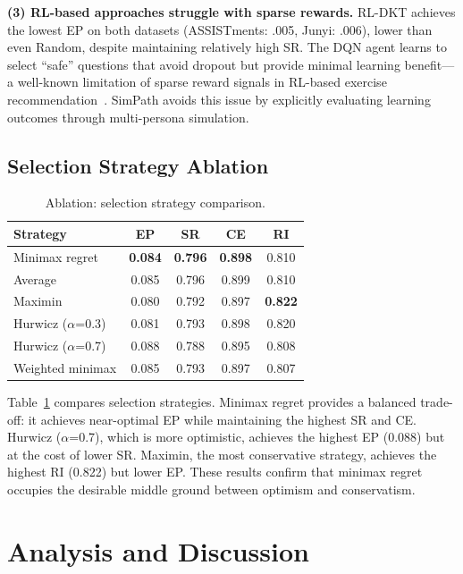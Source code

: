 \documentclass[runningheads]{llncs}
\begin{document}
\textbf{(3) RL-based approaches struggle with sparse rewards.}
RL-DKT achieves the lowest EP on both datasets (ASSISTments: .005, Junyi: .006), lower than even Random, despite maintaining relatively high SR.
The DQN agent learns to select ``safe'' questions that avoid dropout but provide minimal learning benefit---a well-known limitation of sparse reward signals in RL-based exercise recommendation~\cite{cseal2019}.
SimPath avoids this issue by explicitly evaluating learning outcomes through multi-persona simulation.

\subsection{Selection Strategy Ablation}

\begin{table}[t]
\centering
\caption{Ablation: selection strategy comparison.}
\label{tab:ablation_strategy}
\begin{tabular}{lcccc}
\toprule
\textbf{Strategy} & \textbf{EP} & \textbf{SR} & \textbf{CE} & \textbf{RI} \\
\midrule
Minimax regret     & \textbf{0.084} & \textbf{0.796} & \textbf{0.898} & 0.810 \\
Average            & 0.085 & 0.796 & 0.899 & 0.810 \\
Maximin            & 0.080 & 0.792 & 0.897 & \textbf{0.822} \\
Hurwicz ($\alpha$=0.3) & 0.081 & 0.793 & 0.898 & 0.820 \\
Hurwicz ($\alpha$=0.7) & 0.088 & 0.788 & 0.895 & 0.808 \\
Weighted minimax   & 0.085 & 0.793 & 0.897 & 0.807 \\
\bottomrule
\end{tabular}
\end{table}

Table~\ref{tab:ablation_strategy} compares selection strategies.
Minimax regret provides a balanced trade-off: it achieves near-optimal EP while maintaining the highest SR and CE.
Hurwicz ($\alpha$=0.7), which is more optimistic, achieves the highest EP (0.088) but at the cost of lower SR.
Maximin, the most conservative strategy, achieves the highest RI (0.822) but lower EP.
These results confirm that minimax regret occupies the desirable middle ground between optimism and conservatism.

\section{Analysis and Discussion}
\end{document}
